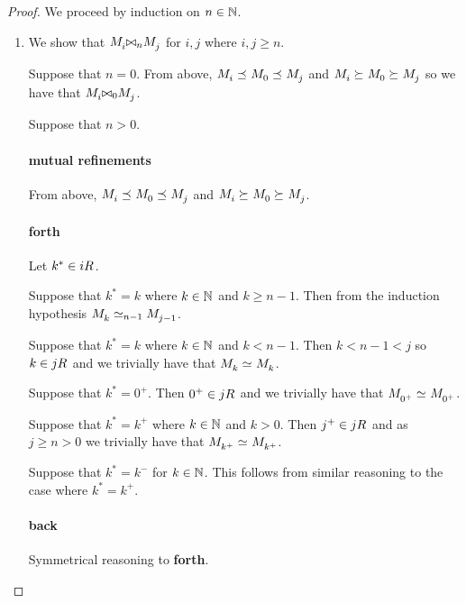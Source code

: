 \begin{proof}
We proceed by induction on $n \in \mathbb{N}$.

\begin{enumerate}
    \item We show that $\kPModel{i} \bisimref[n] \kPModel{j}$ for $i, j$ where $i, j \geq n$.

    Suppose that $n = 0$. 
    From above, $\kPModel{i} \refines \kPModel{0} \refines \kPModel{j}$ and $\kPModel{i} \simulates \kPModel{0} \simulates \kPModel{j}$ so we have that $\kPModel{i} \bisimref[0] \kPModel{j}$.

    Suppose that $n > 0$.

    \paragraph{mutual refinements}

    From above, $\kPModel{i} \refines \kPModel{0} \refines \kPModel{j}$
    and $\kPModel{i} \simulates \kPModel{0} \simulates \kPModel{j}$.

    \paragraph{forth}

    Let $k^* \in \kSuccessors{}{i}$.

    Suppose that $k^* = k$ where $k \in \mathbb{N}$ and $k \geq n - 1$.
    Then from the induction hypothesis $\kPModel{k} \bisimilar [n-1] \kPModel{j - 1}$.

    Suppose that $k^* = k$ where $k \in \mathbb{N}$ and $k < n - 1$.
    Then $k < n - 1 < j$ so $k \in \kSuccessors{}{j}$ and we trivially have that $\kPModel{k} \bisimilar \kPModel{k}$.

    Suppose that $k^* = 0^+$.
    Then $0^+ \in \kSuccessors{}{j}$ and we trivially have that $\kPModel{0^+} \bisimilar \kPModel{0^+}$.

    Suppose that $k^* = k^+$ where $k \in \mathbb{N}$ and $k > 0$.
    Then $j^+ \in \kSuccessors{}{j}$ and as $j \geq n > 0$ we trivially have that $\kPModel{k^+} \bisimilar \kPModel{k^+}$.

    Suppose that $k^* = k^-$ for $k \in \mathbb{N}$. This follows from similar reasoning to the case where $k^* = k^+$.

    \paragraph{back}

    Symmetrical reasoning to {\bf forth}.


\end{enumerate}
\end{proof}
